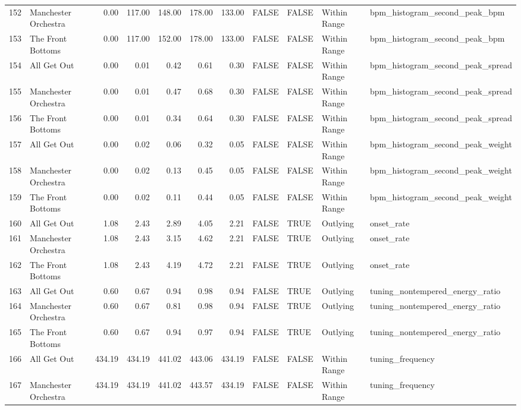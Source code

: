 \begin{table}[ht]
\begin{tabular}{rlrrrrrllll}
  152 & Manchester Orchestra & 0.00 & 117.00 & 148.00 & 178.00 & 133.00 & FALSE & FALSE & Within Range & bpm\_histogram\_second\_peak\_bpm \\ 
  153 & The Front Bottoms & 0.00 & 117.00 & 152.00 & 178.00 & 133.00 & FALSE & FALSE & Within Range & bpm\_histogram\_second\_peak\_bpm \\ 
  154 & All Get Out & 0.00 & 0.01 & 0.42 & 0.61 & 0.30 & FALSE & FALSE & Within Range & bpm\_histogram\_second\_peak\_spread \\ 
  155 & Manchester Orchestra & 0.00 & 0.01 & 0.47 & 0.68 & 0.30 & FALSE & FALSE & Within Range & bpm\_histogram\_second\_peak\_spread \\ 
  156 & The Front Bottoms & 0.00 & 0.01 & 0.34 & 0.64 & 0.30 & FALSE & FALSE & Within Range & bpm\_histogram\_second\_peak\_spread \\ 
  157 & All Get Out & 0.00 & 0.02 & 0.06 & 0.32 & 0.05 & FALSE & FALSE & Within Range & bpm\_histogram\_second\_peak\_weight \\ 
  158 & Manchester Orchestra & 0.00 & 0.02 & 0.13 & 0.45 & 0.05 & FALSE & FALSE & Within Range & bpm\_histogram\_second\_peak\_weight \\ 
  159 & The Front Bottoms & 0.00 & 0.02 & 0.11 & 0.44 & 0.05 & FALSE & FALSE & Within Range & bpm\_histogram\_second\_peak\_weight \\ 
  160 & All Get Out & 1.08 & 2.43 & 2.89 & 4.05 & 2.21 & FALSE & TRUE & Outlying & onset\_rate \\ 
  161 & Manchester Orchestra & 1.08 & 2.43 & 3.15 & 4.62 & 2.21 & FALSE & TRUE & Outlying & onset\_rate \\ 
  162 & The Front Bottoms & 1.08 & 2.43 & 4.19 & 4.72 & 2.21 & FALSE & TRUE & Outlying & onset\_rate \\ 
  163 & All Get Out & 0.60 & 0.67 & 0.94 & 0.98 & 0.94 & FALSE & TRUE & Outlying & tuning\_nontempered\_energy\_ratio \\ 
  164 & Manchester Orchestra & 0.60 & 0.67 & 0.81 & 0.98 & 0.94 & FALSE & TRUE & Outlying & tuning\_nontempered\_energy\_ratio \\ 
  165 & The Front Bottoms & 0.60 & 0.67 & 0.94 & 0.97 & 0.94 & FALSE & TRUE & Outlying & tuning\_nontempered\_energy\_ratio \\ 
  166 & All Get Out & 434.19 & 434.19 & 441.02 & 443.06 & 434.19 & FALSE & FALSE & Within Range & tuning\_frequency \\ 
  167 & Manchester Orchestra & 434.19 & 434.19 & 441.02 & 443.57 & 434.19 & FALSE & FALSE & Within Range & tuning\_frequency \\ 

\end{tabular}
\end{table}
